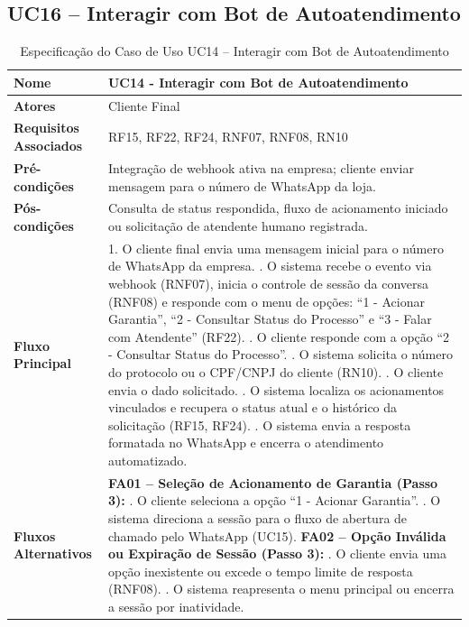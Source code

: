 \subsection{UC16 – Interagir com Bot de Autoatendimento}
\begin{table}[H]
	\centering
	\caption{Especificação do Caso de Uso UC14 – Interagir com Bot de Autoatendimento}
	\label{tab:uc14}
	\begin{tabular}{|p{3.5cm}|p{11.5cm}|}
		\hline
		\textbf{Nome} & UC14 - Interagir com Bot de Autoatendimento \\ \hline
		\textbf{Atores} & Cliente Final \\ \hline
		\textbf{Requisitos Associados} & RF15, RF22, RF24, RNF07, RNF08, RN10 \\ \hline
		\textbf{Pré-condições} & Integração de webhook ativa na empresa; cliente enviar mensagem para o número de WhatsApp da loja. \\ \hline
		\textbf{Pós-condições} & Consulta de status respondida, fluxo de acionamento iniciado ou solicitação de atendente humano registrada. \\ \hline
		\textbf{Fluxo Principal} & 
		1. O cliente final envia uma mensagem inicial para o número de WhatsApp da empresa. \newline
		2. O sistema recebe o evento via webhook (RNF07), inicia o controle de sessão da conversa (RNF08) e responde com o menu de opções: ``1 - Acionar Garantia'', ``2 - Consultar Status do Processo'' e ``3 - Falar com Atendente'' (RF22). \newline
		3. O cliente responde com a opção ``2 - Consultar Status do Processo''. \newline
		4. O sistema solicita o número do protocolo ou o CPF/CNPJ do cliente (RN10). \newline
		5. O cliente envia o dado solicitado. \newline
		6. O sistema localiza os acionamentos vinculados e recupera o status atual e o histórico da solicitação (RF15, RF24). \newline
		7. O sistema envia a resposta formatada no WhatsApp e encerra o atendimento automatizado. \\ \hline
		\textbf{Fluxos Alternativos} & 
		\textbf{FA01 – Seleção de Acionamento de Garantia (Passo 3):} \newline
		1. O cliente seleciona a opção ``1 - Acionar Garantia''. \newline
		2. O sistema direciona a sessão para o fluxo de abertura de chamado pelo WhatsApp (UC15). \newline
		\textbf{FA02 – Opção Inválida ou Expiração de Sessão (Passo 3):} \newline
		1. O cliente envia uma opção inexistente ou excede o tempo limite de resposta (RNF08). \newline
		2. O sistema reapresenta o menu principal ou encerra a sessão por inatividade. \\ \hline
	\end{tabular}
\end{table}

